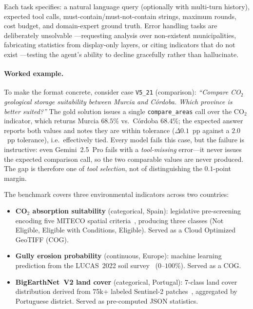 \documentclass[sigconf]{acmart}
\begin{document}
Each task specifies: a natural language query (optionally with multi-turn history), expected tool calls, must-contain/must-not-contain strings, maximum rounds, cost budget, and domain-expert ground truth. Error handling tasks are deliberately unsolvable ---requesting analysis over non-existent municipalities, fabricating statistics from display-only layers, or citing indicators that do not exist ---testing the agent's ability to decline gracefully rather than hallucinate.

\paragraph{Worked example.} To make the format concrete, consider case \texttt{V5\_21} (comparison): \emph{``Compare CO$_2$ geological storage suitability between Murcia and C\'{o}rdoba. Which province is better suited?''} The gold solution issues a single \texttt{compare\_areas} call over the CO$_2$ indicator, which returns Murcia $68.5\%$ vs.\ C\'{o}rdoba $68.4\%$; the expected answer reports both values and notes they are within tolerance ($\Delta 0.1$~pp against a $2.0$~pp tolerance), i.e.\ effectively tied. Every model fails this case, but the failure is instructive: even Gemini~2.5~Pro fails with a \emph{tool-missing} error---it never issues the expected comparison call, so the two comparable values are never produced. The gap is therefore one of \emph{tool selection}, not of distinguishing the $0.1$-point margin.

The benchmark covers three environmental indicators across two countries:

\begin{itemize}
    \item \textbf{CO$_2$ absorption suitability} (categorical, Spain): legislative pre-screening encoding five MITECO spatial criteria~\citep{spain2025rd214}, producing three classes (Not Eligible, Eligible with Conditions, Eligible). Served as a Cloud Optimized GeoTIFF (COG).
    \item \textbf{Gully erosion probability} (continuous, Europe): machine learning prediction from the LUCAS~2022 soil survey~\citep{borrelli2025gully} ($0$--$100\%$). Served as a COG.
    \item \textbf{BigEarthNet~V2 land cover} (categorical, Portugal): 7-class land cover distribution derived from 75k+ labeled Sentinel-2 patches~\citep{clasen2024reben}, aggregated by Portuguese district. Served as pre-computed JSON statistics.
\end{itemize}
\end{document}
